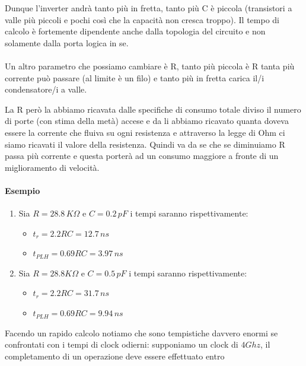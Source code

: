 Dunque l'inverter andrà tanto più in fretta, tanto più C è piccola (transistori a valle più piccoli e pochi così che la capacità non cresca troppo). Il tempo di calcolo è fortemente dipendente anche dalla topologia del circuito e non solamente dalla porta logica in se. 


\paragraph{}

Un altro parametro che possiamo cambiare è R, tanto più piccola è R tanta più corrente può passare (al limite è un filo) e tanto più in fretta carica il/i condensatore/i a valle.

La R però la abbiamo ricavata dalle specifiche di consumo totale diviso il numero di porte (con stima della metà) accese e da li abbiamo ricavato quanta doveva essere la corrente che fluiva su ogni resistenza e attraverso la legge di Ohm ci siamo ricavati il valore della resistenza. Quindi va da se che se diminuiamo R passa più corrente e questa porterà ad un consumo maggiore a fronte di un miglioramento di velocità.


\paragraph{Esempio}

\begin{enumerate}
    \item Sia $R=28.8\, K\Omega$ e $C = 0.2\,pF$ i tempi saranno rispettivamente:
    \begin{itemize}
        \item[] $t_r = 2.2RC = 12.7\, ns$
        \item[] $t_{PLH} = 0.69RC = 3.97 \,ns$
    \end{itemize}

    \item Sia $R=28.8 K\Omega$ e $C = 0.5\,pF$ i tempi saranno rispettivamente:
    \begin{itemize}
        \item[] $t_r = 2.2RC = 31.7\, ns$
        \item[] $t_{PLH} = 0.69RC = 9.94\, ns$
    \end{itemize}
\end{enumerate}

Facendo un rapido calcolo notiamo che sono tempistiche davvero enormi se confrontati con i tempi di clock odierni: supponiamo un clock di $4Ghz$, il completamento di un operazione deve essere effettuato entro 

